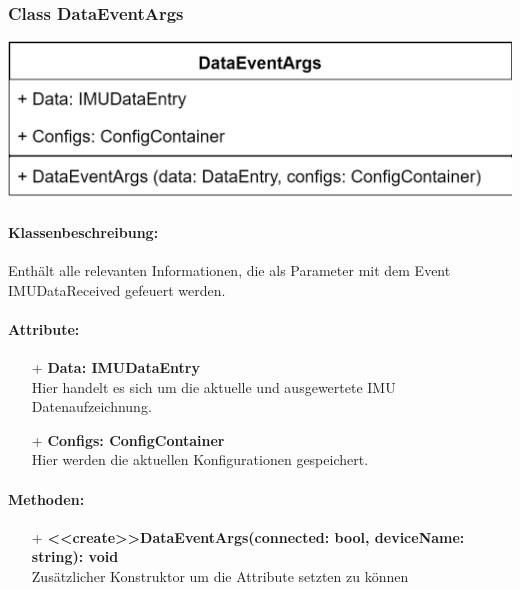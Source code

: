 \documentclass[a4paper,12pt]{article}
\begin{document}
\begin{minipage}[b]{0.5\textwidth}
	\subsubsection{Class DataEventArgs}
	
	\end{minipage}
	\begin{minipage}[c]{0.5\textwidth}
	\includegraphics[width=\textwidth]{bilder/BibPackageKlassen/DataEventArgs.png}
\end{minipage}
\paragraph{Klassenbeschreibung:}
Enthält alle relevanten Informationen, die als Parameter mit dem Event IMUDataReceived gefeuert werden.

\paragraph{Attribute:}
\begin{itemize}
	\item[+] \textbf{Data: IMUDataEntry}\\Hier handelt es sich um die aktuelle und ausgewertete IMU Datenaufzeichnung.
	\item[+] \textbf{Configs: ConfigContainer}\\Hier werden die aktuellen Konfigurationen gespeichert.
\end{itemize}

\paragraph{Methoden:}
\begin{itemize}
	\item[+] \textbf{<<create>>DataEventArgs(connected: bool, deviceName: string): void}\\ Zusätzlicher Konstruktor um die Attribute setzten zu können
\end{itemize}
\end{document}
